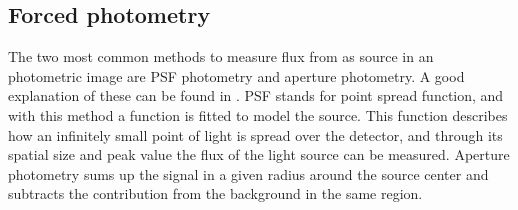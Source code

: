 \documentclass[a4paper,oneside,12pt, class=Latex/Classes/PhDthesisPSnPDF, crop=false]{standalone}
\begin{document}

\subsection{Forced photometry}
The two most common methods to measure flux from as source in an photometric image are PSF photometry and aperture photometry. A good explanation of these can be found in \citet{Photometry_techniques}. PSF stands for point spread function, and with this method a function is fitted to model the source. This function describes how an infinitely small point of light is spread over the detector, and through its spatial size and peak value the flux of the light source can be measured. Aperture photometry sums up the signal in a given radius around the source center and subtracts the contribution from the background in the same region.
\end{document}
